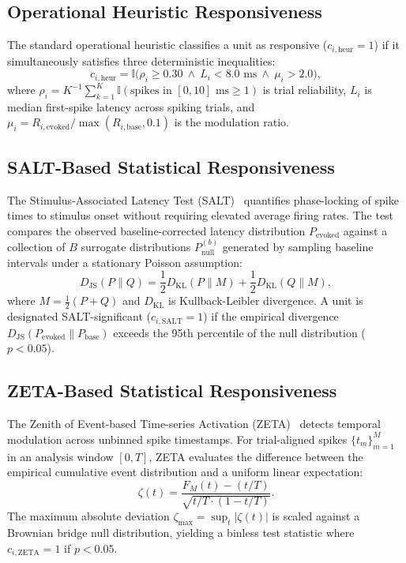 \documentclass[10pt,journal,compsoc]{IEEEtran}
\begin{document}
\subsection{Operational Heuristic Responsiveness}
The standard operational heuristic classifies a unit as responsive ($c_{i,\text{heur}} = 1$) if it simultaneously satisfies three deterministic inequalities:
\begin{equation}
    c_{i,\text{heur}} = \mathbb{I}\Big( \rho_i \ge 0.30 \ \land \ L_i < 8.0\text{ ms} \ \land \ \mu_i > 2.0 \Big),
\end{equation}
where $\rho_i = K^{-1} \sum_{k=1}^K \mathbb{I}(\text{spikes in }[0, 10]\text{ ms} \ge 1)$ is trial reliability, $L_i$ is median first-spike latency across spiking trials, and $\mu_i = R_{i,\text{evoked}} / \max(R_{i,\text{base}}, 0.1)$ is the modulation ratio.

\subsection{SALT-Based Statistical Responsiveness}
The Stimulus-Associated Latency Test (SALT)~\cite{kvitsiani2013distinct,hangya2015central} quantifies phase-locking of spike times to stimulus onset without requiring elevated average firing rates. The test compares the observed baseline-corrected latency distribution $P_{\text{evoked}}$ against a collection of $B$ surrogate distributions $P_{\text{null}}^{(b)}$ generated by sampling baseline intervals under a stationary Poisson assumption:
\begin{equation}
    D_{\text{JS}}(P \parallel Q) = \frac{1}{2} D_{\text{KL}}(P \parallel M) + \frac{1}{2} D_{\text{KL}}(Q \parallel M),
\end{equation}
where $M = \frac{1}{2}(P + Q)$ and $D_{\text{KL}}$ is Kullback-Leibler divergence. A unit is designated SALT-significant ($c_{i,\text{SALT}} = 1$) if the empirical divergence $D_{\text{JS}}(P_{\text{evoked}} \parallel P_{\text{base}})$ exceeds the 95th percentile of the null distribution ($p < 0.05$).

\subsection{ZETA-Based Statistical Responsiveness}
The Zenith of Event-based Time-series Activation (ZETA)~\cite{montijn2021zeta} detects temporal modulation across unbinned spike timestamps. For trial-aligned spikes $\{t_m\}_{m=1}^M$ in an analysis window $[0, T]$, ZETA evaluates the difference between the empirical cumulative event distribution and a uniform linear expectation:
\begin{equation}
    \zeta(t) = \frac{F_M(t) - (t/T)}{\sqrt{t/T \cdot (1 - t/T)}}.
\end{equation}
The maximum absolute deviation $\zeta_{\max} = \sup_{t} |\zeta(t)|$ is scaled against a Brownian bridge null distribution, yielding a binless test statistic where $c_{i,\text{ZETA}} = 1$ if $p < 0.05$.
\end{document}
